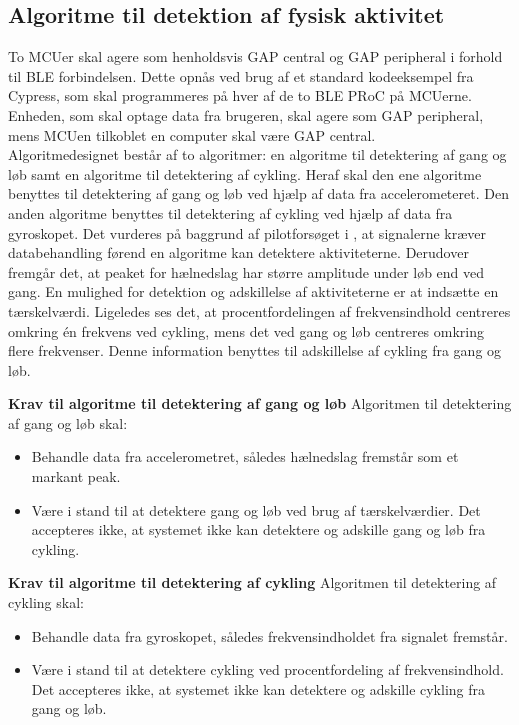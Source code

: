 \subsection{Algoritme til detektion af fysisk aktivitet} \label{krav_algoritme}
To MCUer skal agere som henholdsvis GAP central og GAP peripheral i forhold til BLE forbindelsen. Dette opnås ved brug af et standard kodeeksempel fra Cypress, som skal programmeres på hver af de to BLE PRoC på MCUerne. Enheden, som skal optage data fra brugeren, skal agere som GAP peripheral, mens MCUen tilkoblet en computer skal være GAP central. \\
Algoritmedesignet består af to algoritmer: en algoritme til detektering af gang og løb samt en algoritme til detektering af cykling. Heraf skal den ene algoritme benyttes til detektering af gang og løb ved hjælp af data fra accelerometeret. Den anden algoritme benyttes til detektering af cykling ved hjælp af data fra gyroskopet. Det vurderes på baggrund af pilotforsøget i , at signalerne kræver databehandling førend en algoritme kan detektere aktiviteterne. Derudover fremgår det, at peaket for hælnedslag har større amplitude under løb end ved gang. En mulighed for detektion og adskillelse af aktiviteterne er at indsætte en tærskelværdi. Ligeledes ses det, at procentfordelingen af frekvensindhold centreres omkring én frekvens ved cykling, mens det ved gang og løb centreres omkring flere frekvenser. Denne information benyttes til adskillelse af cykling fra gang og løb. 

\textbf{Krav til algoritme til detektering af gang og løb} \newline 
Algoritmen til detektering af gang og løb skal:
\begin{itemize}
	\item Behandle data fra accelerometret, således hælnedslag fremstår som et markant peak.
	\item Være i stand til at detektere gang og løb ved brug af tærskelværdier. Det accepteres ikke, at systemet ikke kan detektere og adskille gang og løb fra cykling.
\end{itemize}

\textbf{Krav til algoritme til detektering af cykling} \newline 
Algoritmen til detektering af cykling skal:
\begin{itemize}
	\item Behandle data fra gyroskopet, således frekvensindholdet fra signalet fremstår.
	\item Være i stand til at detektere cykling ved procentfordeling af frekvensindhold. Det accepteres ikke, at systemet ikke kan detektere og adskille cykling fra gang og løb.
\end{itemize}

